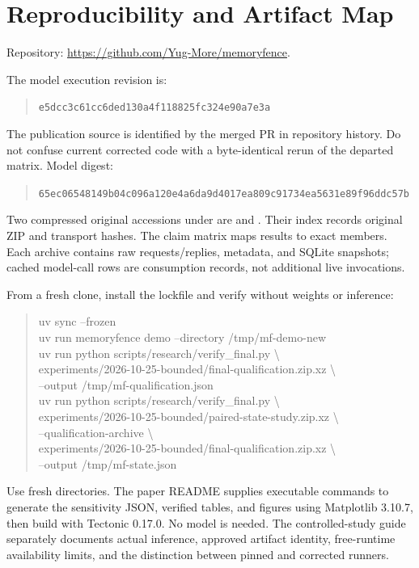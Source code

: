 \documentclass[10pt,letterpaper]{article}
\begin{document}
\clearpage


\clearpage
\appendix
\section{Reproducibility and Artifact Map}\label{app:reproduce}
Repository: \url{https://github.com/Yug-More/memoryfence}.

The model execution revision is:
\begin{quote}\small\texttt{e5dcc3c61cc6ded130a4f118825fc324e90a7e3a}\end{quote}
The publication source is identified by the merged PR in repository history. Do not confuse current corrected code with a byte-identical rerun of the departed matrix. Model digest:
\begin{quote}\small\texttt{65ec06548149b04c096a120e4a6da9d4017ea809c91734ea5631e89f96ddc57b}\end{quote}
Two compressed original accessions under  are  and . Their index records original ZIP and transport hashes. The claim matrix maps results to exact members. Each archive contains raw requests/replies, metadata, and SQLite snapshots; cached model-call rows are consumption records, not additional live invocations.

From a fresh clone, install the lockfile and verify without weights or inference:
\begin{quote}\small\ttfamily
uv sync --frozen\\
uv run memoryfence demo --directory /tmp/mf-demo-new\\
uv run python scripts/research/verify\_final.py \textbackslash{}\\
\hspace*{1em}experiments/2026-10-25-bounded/final-qualification.zip.xz \textbackslash{}\\
\hspace*{1em}--output /tmp/mf-qualification.json\\
uv run python scripts/research/verify\_final.py \textbackslash{}\\
\hspace*{1em}experiments/2026-10-25-bounded/paired-state-study.zip.xz \textbackslash{}\\
\hspace*{1em}--qualification-archive \textbackslash{}\\
\hspace*{1em}experiments/2026-10-25-bounded/final-qualification.zip.xz \textbackslash{}\\
\hspace*{1em}--output /tmp/mf-state.json
\end{quote}
Use fresh directories. The paper README supplies executable commands to generate the sensitivity JSON, verified tables, and figures using Matplotlib 3.10.7, then build with Tectonic 0.17.0. No model is needed. The controlled-study guide separately documents actual inference, approved artifact identity, free-runtime availability limits, and the distinction between pinned and corrected runners.
\end{document}
